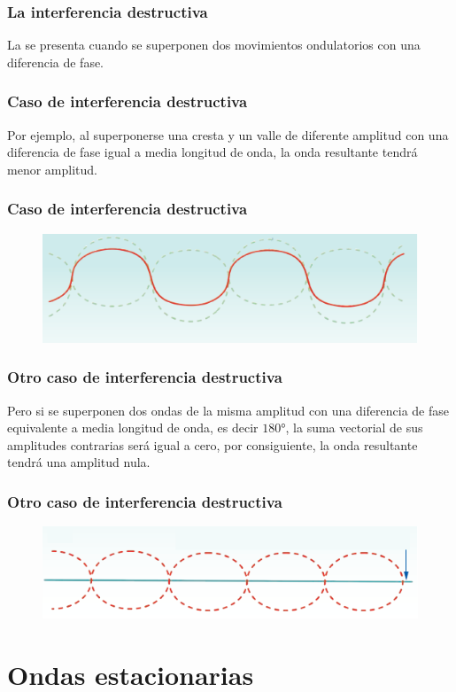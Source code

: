 \documentclass[14pt]{beamer}
\begin{document}
\begin{frame}
\frametitle{La interferencia destructiva}
La  se presenta cuando se superponen dos movimientos ondulatorios con una diferencia de fase.
\end{frame}
\begin{frame}
\frametitle{Caso de interferencia destructiva}
Por ejemplo, al superponerse una cresta y un valle de diferente amplitud con una diferencia de fase igual a
media longitud de onda, \pause la onda resultante tendrá menor amplitud.
\end{frame}
\begin{frame}
\frametitle{Caso de interferencia destructiva}
\begin{figure}
    \centering
    \includegraphics[scale=0.8]{Imagenes/Interferencia_Desctructiva_02.png}
\end{figure}
\end{frame}
\begin{frame}
\frametitle{Otro caso de interferencia destructiva}
Pero si se superponen dos ondas de la misma amplitud con una diferencia de fase equivalente a media longitud de onda, es decir $\ang{180}$, \pause la suma vectorial de sus amplitudes contrarias será igual a cero, \pause  por consiguiente, la onda resultante tendrá una amplitud nula.
\end{frame}
\begin{frame}
\frametitle{Otro caso de interferencia destructiva}
\begin{figure}
    \centering
    \includegraphics[scale=0.8]{Imagenes/Interferencia_Desctructiva_03.png}
\end{figure}
\end{frame}

\section{Ondas estacionarias}
\end{document}
